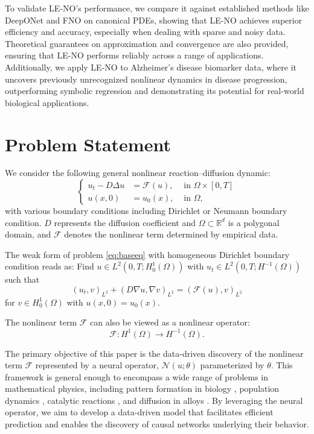 \documentclass[preprint,12pt]{elsarticle}
\theoremstyle{plain}
\numberwithin{figure}{section}
\numberwithin{table}{section}
\begin{document}
To validate LE-NO’s performance, we compare it against established methods like DeepONet and FNO on canonical PDEs, showing that LE-NO achieves superior efficiency and accuracy, especially when dealing with sparse and noisy data. Theoretical guarantees on approximation and convergence are also provided, ensuring that LE-NO performs reliably across a range of applications. Additionally, we apply LE-NO to Alzheimer’s disease biomarker data, where it uncovers previously unrecognized nonlinear dynamics in disease progression, outperforming symbolic regression and demonstrating its potential for real-world biological applications.

\section{Problem Statement}\label{sec:preliminary}

We consider the following general nonlinear reaction--diffusion dynamic:
\begin{equation}\label{eq:baseeq}
	\left\{
	\begin{aligned}
		u_t-D\Delta u&= \mathcal{F}(u), & \text{ in }\Omega\times [0,T]\\
		u(x,0) &= u_0(x), &\text{ in }\Omega,
	\end{aligned}\right.
\end{equation}
with various boundary conditions including Dirichlet or Neumann boundary condition. $D$ represents the diffusion coefficient and $\Omega\subset \mathbb{R}^d$ is a polygonal domain, and $\mathcal{F}$ denotes the nonlinear term determined by empirical data.

The weak form of problem \eqref{eq:baseeq} with homogeneous Dirichlet boundary condition reads as: Find $u\in L^2(0,T;H_0^1(\Omega))$ with $u_t\in L^2(0,T;H^{-1}(\Omega))$ such that
\begin{equation}\label{eq:originvp}
	(u_t,v)_{L^2}+(D\nabla u,\nabla v)_{L^2} = (\mathcal{F}(u),v)_{L^2} 
\end{equation}
for $ v \in H^1_0(\Omega)$ with $u(x,0) = u_0(x)$.



The nonlinear term  $\mathcal{F}$  can also be viewed as a nonlinear operator:
\begin{equation}
	\mathcal{F}:H^1(\Omega) \rightarrow H^{-1}(\Omega). 
\end{equation} 

The primary objective of this paper is the data-driven discovery of the nonlinear term $\mathcal{F}$  represented by a neural operator, $\mathcal{N}(u;\theta)$ parameterized by $\theta$. This framework is general enough to encompass a wide range of problems in mathematical physics, including pattern formation in biology \cite{gierer1972theory}, population dynamics \cite{holmes1994partial}, catalytic reactions \cite{gupta2009linear}, and diffusion in alloys \cite{allen1975coherent}. By leveraging the neural operator, we aim to develop a data-driven model that facilitates efficient prediction and enables the discovery of causal networks underlying their behavior.
\end{document}
